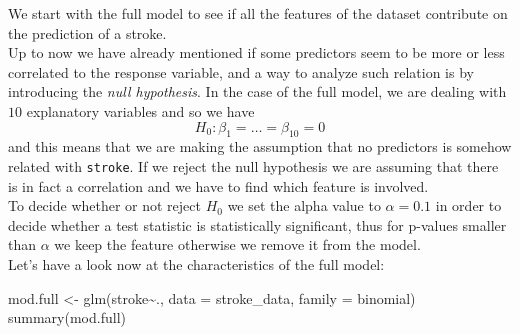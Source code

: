 \documentclass[
]{article}
\newenvironment{Shaded}{\begin{snugshade}}{\end{snugshade}}
\newcommand{\AttributeTok}[1]{\textcolor[rgb]{0.77,0.63,0.00}{#1}}
\newcommand{\FunctionTok}[1]{\textcolor[rgb]{0.00,0.00,0.00}{#1}}
\newcommand{\NormalTok}[1]{#1}
\newcommand{\OtherTok}[1]{\textcolor[rgb]{0.56,0.35,0.01}{#1}}
\newcommand{\SpecialCharTok}[1]{\textcolor[rgb]{0.00,0.00,0.00}{#1}}
\begin{document}
We start with the full model to see if all the features of the dataset
contribute on the prediction of a stroke.\\
Up to now we have already mentioned if some predictors seem to be more
or less correlated to the response variable, and a way to analyze such
relation is by introducing the \emph{null hypothesis}. In the case of
the full model, we are dealing with \(10\) explanatory variables and so
we have \[H_0 : \beta_1 = \dots = \beta_{10} = 0\] and this means that
we are making the assumption that no predictors is somehow related with
\texttt{stroke}. If we reject the null hypothesis we are assuming that
there is in fact a correlation and we have to find which feature is
involved.\\
To decide whether or not reject \(H_0\) we set the alpha value to
\(\alpha = 0.1\) in order to decide whether a test statistic is
statistically significant, thus for p-values smaller than \(\alpha\) we
keep the feature otherwise we remove it from the model.\\
Let's have a look now at the characteristics of the full model:

\begin{Shaded}
\begin{Highlighting}[]
\NormalTok{mod.full }\OtherTok{\textless{}{-}} \FunctionTok{glm}\NormalTok{(stroke}\SpecialCharTok{\textasciitilde{}}\NormalTok{., }\AttributeTok{data =}\NormalTok{ stroke\_data, }\AttributeTok{family =}\NormalTok{ binomial)}
\FunctionTok{summary}\NormalTok{(mod.full)}
\end{Highlighting}
\end{Shaded}
\end{document}
